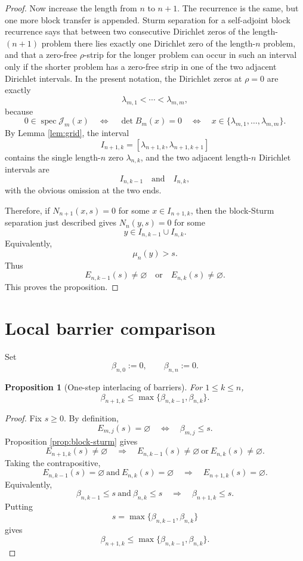 \documentclass[11pt]{amsart}
\numberwithin{equation}{section}
\newtheorem{proposition}[theorem]{Proposition}
\DeclareMathOperator{\spec}{spec}
\begin{document}
\begin{proof}
Now increase the length from \(n\) to \(n+1\).  The recurrence is the same,
but one more block transfer is appended.  Sturm separation for a
self-adjoint block recurrence says that between two consecutive Dirichlet
zeros of the length-\((n+1)\) problem there lies exactly one Dirichlet zero
of the length-\(n\) problem, and that a zero-free \(\rho\)-strip for the
longer problem can occur in such an interval only if the shorter problem has
a zero-free strip in one of the two adjacent Dirichlet intervals.  In the
present notation, the Dirichlet zeros at \(\rho=0\) are exactly
\[
        \lambda_{m,1}<\cdots<\lambda_{m,m},
\]
because
\[
        0\in\spec\mathcal J_m(x)
        \quad\Longleftrightarrow\quad
        \det B_m(x)=0
        \quad\Longleftrightarrow\quad
        x\in\{\lambda_{m,1},\dots,\lambda_{m,m}\}.
\]
By Lemma \ref{lem:grid}, the interval
\[
        I_{n+1,k}=[\lambda_{n+1,k},\lambda_{n+1,k+1}]
\]
contains the single length-\(n\) zero \(\lambda_{n,k}\), and the two adjacent
length-\(n\) Dirichlet intervals are
\[
        I_{n,k-1}
        \quad\text{and}\quad
        I_{n,k},
\]
with the obvious omission at the two ends.

Therefore, if \(N_{n+1}(x,s)=0\) for some
\(x\in I_{n+1,k}\), then the block-Sturm separation just described gives
\(N_n(y,s)=0\) for some
\[
        y\in I_{n,k-1}\cup I_{n,k}.
\]
Equivalently,
\[
        \mu_n(y)>s.
\]
Thus
\[
        E_{n,k-1}(s)\ne\varnothing
        \quad\text{or}\quad
        E_{n,k}(s)\ne\varnothing.
\]
This proves the proposition.
\end{proof}

\section{Local barrier comparison}

Set
\[
        \beta_{n,0}:=0,
        \qquad
        \beta_{n,n}:=0.
\]

\begin{proposition}[One-step interlacing of barriers]\label{prop:local}
For \(1\le k\le n\),
\[
        \beta_{n+1,k}
        \le
        \max\{\beta_{n,k-1},\beta_{n,k}\}.
\]
\end{proposition}

\begin{proof}
Fix \(s\ge0\).  By definition,
\[
        E_{m,j}(s)=\varnothing
        \quad\Longleftrightarrow\quad
        \beta_{m,j}\le s.
\]
Proposition \ref{prop:block-sturm} gives
\[
        E_{n+1,k}(s)\ne\varnothing
        \quad\Longrightarrow\quad
        E_{n,k-1}(s)\ne\varnothing
        \ \text{or}\
        E_{n,k}(s)\ne\varnothing .
\]
Taking the contrapositive,
\[
        E_{n,k-1}(s)=\varnothing
        \ \text{and}\
        E_{n,k}(s)=\varnothing
        \quad\Longrightarrow\quad
        E_{n+1,k}(s)=\varnothing .
\]
Equivalently,
\[
        \beta_{n,k-1}\le s
        \ \text{and}\
        \beta_{n,k}\le s
        \quad\Longrightarrow\quad
        \beta_{n+1,k}\le s.
\]
Putting
\[
        s=\max\{\beta_{n,k-1},\beta_{n,k}\}
\]
gives
\[
        \beta_{n+1,k}
        \le
        \max\{\beta_{n,k-1},\beta_{n,k}\}.
\]
\end{proof}
\end{document}
